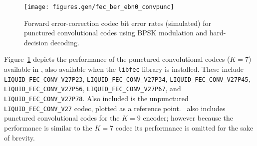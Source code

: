 \begin{figure}
\centering
\texttt{[image: figures.gen/fec\_ber\_ebn0\_convpunc]}
\caption{Forward error-correction codec bit error rates (simulated)
         for punctured convolutional codes
         using BPSK modulation and hard-decision decoding.}
\label{fig:fec:convpunc_ber}
\end{figure}
%
Figure~\ref{fig:fec:convpunc_ber} depicts the performance of the
punctured convolutional codecs ($K=7$) available in \liquid,
also available when the {\tt libfec} library is installed.
These include
{\tt LIQUID\_FEC\_CONV\_V27P23},
{\tt LIQUID\_FEC\_CONV\_V27P34},
{\tt LIQUID\_FEC\_CONV\_V27P45},
{\tt LIQUID\_FEC\_CONV\_V27P56},
{\tt LIQUID\_FEC\_CONV\_V27P67}, and
{\tt LIQUID\_FEC\_CONV\_V27P78}.
Also included is the unpunctured {\tt LIQUID\_FEC\_CONV\_V27} codec,
plotted as a reference point.
\liquid\ also includes punctured convolutional codes for the $K=9$
encoder;
however because the performance is similar to the $K=7$ codec
its performance is omitted for the sake of brevity.


